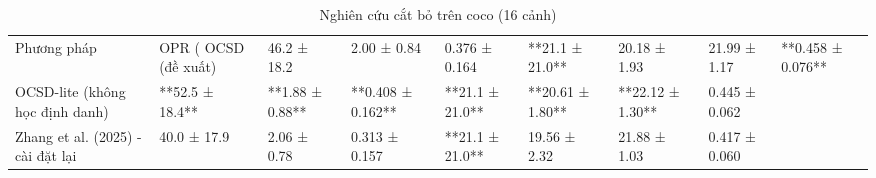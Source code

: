 \begin{table}
\caption{Nghiên cứu cắt bỏ trên coco (16 cảnh)}
\begin{tabular}{llllllll}
\toprule
Phương pháp & OPR (%
\midrule
OCSD (đề xuất) & 46.2 ± 18.2 & 2.00 ± 0.84 & 0.376 ± 0.164 & **21.1 ± 21.0** & 20.18 ± 1.93 & 21.99 ± 1.17 & **0.458 ± 0.076** \\
OCSD-lite (không học định danh) & **52.5 ± 18.4** & **1.88 ± 0.88** & **0.408 ± 0.162** & **21.1 ± 21.0** & **20.61 ± 1.80** & **22.12 ± 1.30** & 0.445 ± 0.062 \\
Zhang et al. (2025) - cài đặt lại & 40.0 ± 17.9 & 2.06 ± 0.78 & 0.313 ± 0.157 & **21.1 ± 21.0** & 19.56 ± 2.32 & 21.88 ± 1.03 & 0.417 ± 0.060 \\
\bottomrule
\end{tabular}
\end{table}
